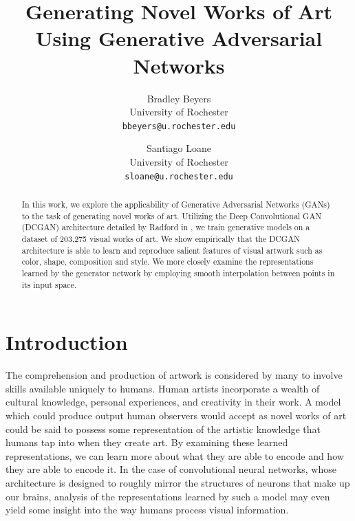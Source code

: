 \documentclass[10pt,twocolumn,letterpaper]{article}
\begin{document}
\title{Generating Novel Works of Art Using Generative Adversarial Networks}

\author{Bradley Beyers\\
	University of Rochester\\
	{\tt\small bbeyers@u.rochester.edu}
	\and
	Santiago Loane\\
	University of Rochester\\
	{\tt\small sloane@u.rochester.edu}
}


\maketitle

\begin{abstract}
   In this work, we explore the applicability of Generative Adversarial Networks (GANs)
   to the task of generating novel works of art. Utilizing the Deep Convolutional GAN (DCGAN)
   architecture detailed by Radford \etal in \cite{radford2015unsupervised}, we train
   generative models on a dataset of 203,275 visual works of art. We show empirically that the
   DCGAN architecture is able to learn and reproduce salient features of visual artwork such as
   color, shape, composition and style. We more closely examine the representations learned by
   the generator network by employing smooth interpolation between points in its input space.
\end{abstract}

\section{Introduction}
The comprehension and production of artwork is considered by many to involve skills available
uniquely to humans. Human artists incorporate a wealth of cultural knowledge, personal experiences,
and creativity in their work. A model which could produce output human observers would accept
as novel works of art could be said to possess some representation of the artistic knowledge
that humans tap into when they create art. By examining these learned representations, we can
learn more about what they are able to encode and how they are able to encode it. In the case of convolutional neural networks, whose architecture is designed to roughly mirror the structures of neurons that make up our brains, analysis of the representations learned by such a model may even yield some insight into the way humans process visual information.
\end{document}
